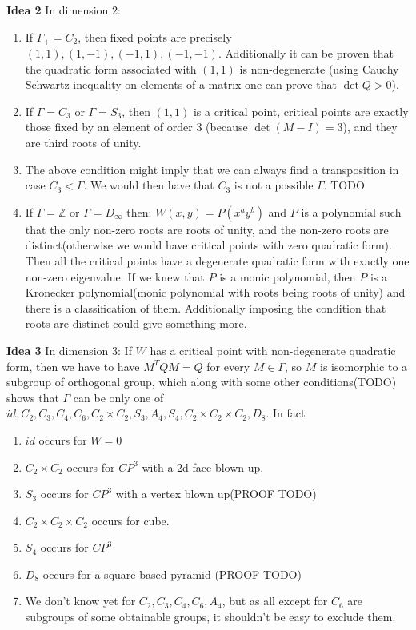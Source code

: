 \documentclass[a4paper]{article}
\begin{document}
\textbf{Idea 2}
In dimension $2$:
\begin{enumerate}
	\item If $\Gamma_+ = C_2$, then fixed points are precisely $(1,1), (1,-1), (-1,1), (-1, -1)$. Additionally it can be proven that the quadratic form associated with $(1,1)$ is non-degenerate (using Cauchy Schwartz inequality on elements of a matrix one can prove that $\det Q > 0$).
	\item If $\Gamma = C_3$ or $\Gamma = S_3$, then $(1,1)$ is a critical point, critical points are exactly those fixed by an element of order $3$ (because $\det(M-I) = 3$), and they are third roots of unity.
	\item The above condition might imply that we can always find a transposition in case $C_3 < \Gamma$. We would then have that $C_3$ is not a possible $\Gamma$. TODO
	\item If $\Gamma = \mathbb{Z}$ or $\Gamma = D_\infty$ then:
	$W(x, y) = P(x^a y^b)$ and $P$ is a polynomial such that the only non-zero roots are roots of unity, and the non-zero roots are distinct(otherwise we would have critical points with zero quadratic form). Then all the critical points have a degenerate quadratic form with exactly one non-zero eigenvalue.
	If we knew that $P$ is a monic polynomial, then $P$ is a Kronecker polynomial(monic polynomial with roots being roots of unity) and there is a classification of them. Additionally imposing the condition that roots are distinct could give something more.
\end{enumerate}
\textbf{Idea 3}
In dimension 3:
If $W$ has a critical point with non-degenerate quadratic form, then we have to have $M^T Q M = Q$ for every $M \in \Gamma$, so $M$ is isomorphic to a subgroup of orthogonal group, which along with some other conditions(TODO) shows that $\Gamma$ can be only one of $id, C_2, C_3, C_4, C_6, C_2 \times C_2, S_3, A_4, S_4, C_2 \times C_2 \times C_2, D_8$. In fact
\begin{enumerate}
	\item $id$ occurs for $W = 0$
	\item $C_2 \times C_2$ occurs for $CP^3$ with a 2d face blown up.
	\item $S_3$ occurs for $CP^3$ with a vertex blown up(PROOF TODO)
	\item $C_2 \times C_2 \times C_2$ occurs for cube.
	\item $S_4$ occurs for $CP^3$
	\item $D_8$ occurs for a square-based pyramid (PROOF TODO)
	\item We don't know yet for $C_2, C_3, C_4, C_6, A_4$, but as all except for $C_6$ are subgroups of some obtainable groups, it shouldn't be easy to exclude them.
\end{enumerate}
\end{document}
